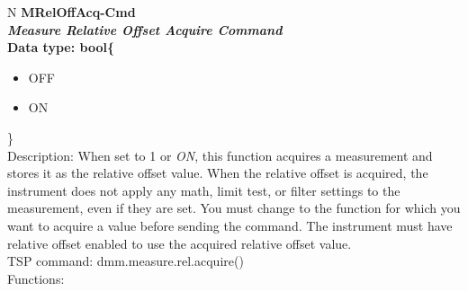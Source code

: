 \documentclass[openany]{article}
\begin{document}
		\begin{tabular}{N}
			\hline
			\bfseries MRelOffAcq-Cmd\label{pv:mreloffacq-cmd} \\ \hline
			\emph{Measure Relative Offset Acquire Command} \\
			Data type: bool\{\begin{itemize}[noitemsep]
				\small
				\item[] OFF
				\item[] ON
			\end{itemize}\} \\
			Description: When set to 1 or \emph{ON}, this function acquires a measurement and stores it as the relative offset value. When the relative offset is acquired, the instrument does not apply any math, limit test, or filter settings to the measurement, even if they are set. You must change to the function for which you want to acquire a value before sending the command. The instrument must have relative offset enabled to use the acquired relative offset value. \\
			TSP command: dmm.measure.rel.acquire() \\
			Functions: \\
			\arrayrulecolor{\FuncTableBorderColor}

		\end{tabular}
\end{document}
